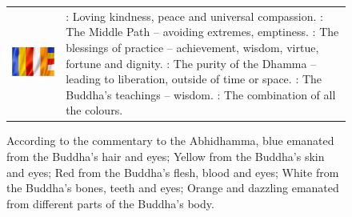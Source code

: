 \begin{figure}[H]
\begin{tabular*}{\textwidth}{L{\tabcolsep} L{\tabcolsep}}

\includegraphics[width=1\linewidth]{./Diagrams/Flag} & : Loving kindness, peace and universal compassion.\newline
{}: The Middle Path – avoiding extremes, emptiness.\newline
{}: The blessings of practice – achievement, wisdom, virtue, fortune and dignity.\newline
{}: The purity of the Dhamma – leading to liberation, outside of time or space.\newline
{}: The Buddha’s teachings – wisdom.\newline
{}: The combination of all the colours.\\

\end{tabular*}

\caption{According to the commentary to the Abhidhamma, blue emanated from the Buddha’s hair and eyes; Yellow from the Buddha’s skin and eyes; Red from the Buddha’s flesh, blood and eyes; White from the Buddha’s bones, teeth and eyes; Orange and dazzling emanated from different parts of the Buddha’s body.}
\label{fig:Flag}
\end{figure}

\pagebreak

